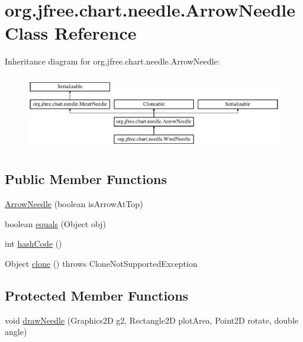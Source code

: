 \hypertarget{classorg_1_1jfree_1_1chart_1_1needle_1_1_arrow_needle}{}\section{org.\+jfree.\+chart.\+needle.\+Arrow\+Needle Class Reference}
\label{classorg_1_1jfree_1_1chart_1_1needle_1_1_arrow_needle}
Inheritance diagram for org.\+jfree.\+chart.\+needle.\+Arrow\+Needle\+:\begin{figure}[H]
\begin{center}
\leavevmode
\includegraphics[height=3.348281cm]{classorg_1_1jfree_1_1chart_1_1needle_1_1_arrow_needle}
\end{center}
\end{figure}
\subsection*{Public Member Functions}
\begin{DoxyCompactItemize}
\item 
\mbox{\hyperlink{classorg_1_1jfree_1_1chart_1_1needle_1_1_arrow_needle_a1def7455a0d620e9e3685ab0e757cb35}{Arrow\+Needle}} (boolean is\+Arrow\+At\+Top)
\item 
boolean \mbox{\hyperlink{classorg_1_1jfree_1_1chart_1_1needle_1_1_arrow_needle_a504705440238053fd9b4e5c11c3963ce}{equals}} (Object obj)
\item 
int \mbox{\hyperlink{classorg_1_1jfree_1_1chart_1_1needle_1_1_arrow_needle_a9331b42541a9fda605efa109f7380817}{hash\+Code}} ()
\item 
Object \mbox{\hyperlink{classorg_1_1jfree_1_1chart_1_1needle_1_1_arrow_needle_a6627aeb96f6d834e35a86105aeebfe0c}{clone}} ()  throws Clone\+Not\+Supported\+Exception 
\end{DoxyCompactItemize}
\subsection*{Protected Member Functions}
\begin{DoxyCompactItemize}
\item 
void \mbox{\hyperlink{classorg_1_1jfree_1_1chart_1_1needle_1_1_arrow_needle_a20f66ecce6a13085865604fbd07c089b}{draw\+Needle}} (Graphics2D g2, Rectangle2D plot\+Area, Point2D rotate, double angle)
\end{DoxyCompactItemize}
